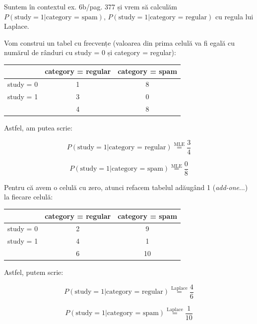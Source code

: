 \documentclass[12pt]{article}
\begin{document}
	Suntem în contextul ex. 6b/pag. 377 și vrem să calculăm $P(\text{study}=1|\text{category = spam})$, $P(\text{study}=1|\text{category = regular})$ cu regula lui Laplace.
	
	Vom construi un tabel cu frecvențe (valoarea din prima celulă va fi egală cu numărul de rânduri cu study = 0 și category = regular):
	
	 \begin{tabular}{ c | c | c }
	 	 & category = regular & category = spam \\ 
	 	\hline
	 	study = 0 & 1 & 8 \\  
	 	study = 1 & 3 & 0 \\
	 	\hline \hline
	 	& 4 & 8
	 \end{tabular}
	
	Astfel, am putea scrie:
	
	$$P(\text{study}=1|\text{category = regular}) \stackrel{\text{MLE}}{=} \frac{3}{4}$$
	
	$$P(\text{study}=1|\text{category = spam}) \stackrel{\text{MLE}}{=} \frac{0}{8}$$
	
	Pentru că avem o celulă cu zero, atunci refacem tabelul adăugând 1 (\textit{add-one}...) la fiecare celulă:
	
	\begin{tabular}{ c | c | c }
		& category = regular & category = spam \\ 
		\hline
		study = 0 & 2 & 9 \\  
		study = 1 & 4 & 1 \\
		\hline \hline
		& 6 & 10
	\end{tabular}

	Astfel, putem scrie:
	
	$$P(\text{study}=1|\text{category = regular}) \stackrel{\text{Laplace}}{=} \frac{4}{6}$$
	
	$$P(\text{study}=1|\text{category = spam}) \stackrel{\text{Laplace}}{=} \frac{1}{10}$$
	
\end{document}
